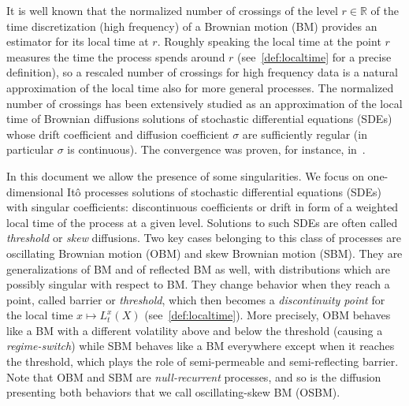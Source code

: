 \documentclass[12pt]{article}
\numberwithin{equation}{section}
\theoremstyle{definition}
\theoremstyle{remark}
\newcommand{\RR}{\mathbb{R}}
\begin{document}
It is well known that the normalized number of crossings of the level $r\in \RR$ of the time discretization (high frequency) of a Brownian motion (BM) provides an estimator for its local time at $r$. 
Roughly speaking the local time at the point $r$ 
measures the time the process spends around $r$ (see~\eqref{def:localtime} for a precise definition), so a rescaled number of crossings for high frequency data is a natural approximation of the local time also for more general processes. 
The normalized number of crossings has been extensively studied as an approximation of the local time of Brownian diffusions solutions of stochastic differential equations (SDEs) whose 
drift coefficient and diffusion coefficient $\sigma$ are sufficiently regular (in particular $\sigma$ is continuous). 
The convergence was proven, for instance, in~\cite{azais,azais2}. %
%
%

In this document we %
allow the presence of some singularities. We focus on one-dimensional It\^o processes solutions of stochastic differential equations (SDEs) with singular coefficients: 
discontinuous coefficients or drift in form of a weighted local time of the process at a given level. 
Solutions to such SDEs are often called {\em threshold\/} or {\em skew\/} diffusions. 
%
Two key cases belonging to this class of processes are oscillating Brownian motion (OBM) and skew Brownian motion (SBM).
%
They are generalizations of BM and of reflected BM as well, with distributions which are possibly singular with respect to BM. 
They change behavior when they reach a point, called barrier or {\em threshold\/}, which then becomes a {\em discontinuity point\/} for the local time $x\mapsto L^x_t(X)$ (see~\eqref{def:localtime}).
More precisely, OBM behaves like a BM with a different volatility above and below the threshold (causing a {\em regime-switch\/}) while SBM behaves like a BM everywhere except when it reaches the threshold, which plays the role of semi-permeable and semi-reflecting barrier. 
%
Note that OBM and SBM are {\em null-recurrent\/} processes, and so is the diffusion presenting both behaviors that we call oscillating-skew BM (OSBM).
\end{document}
